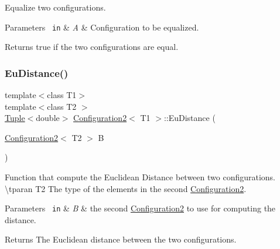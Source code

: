 Equalize two configurations. 


\begin{DoxyParams}[1]{Parameters}
\mbox{\texttt{ in}}  & {\em A} & Configuration to be equalized. \\
\hline
\end{DoxyParams}
\begin{DoxyReturn}{Returns}
true if the two configurations are equal. 
\end{DoxyReturn}
\mbox{\label{class_configuration2_aae3e1b7e718b227b6fa65db67ab2b8eb}} 
\subsubsection{\texorpdfstring{EuDistance()}{EuDistance()}}
{\footnotesize\ttfamily template$<$class T1$>$ \\
template$<$class T2 $>$ \\
\mbox{\hyperlink{class_tuple}{Tuple}}$<$double$>$ \mbox{\hyperlink{class_configuration2}{Configuration2}}$<$ T1 $>$\+::Eu\+Distance (\begin{DoxyParamCaption}\item[{\mbox{\hyperlink{class_configuration2}{Configuration2}}$<$ T2 $>$}]{B }\end{DoxyParamCaption})\hspace{0.3cm}{\ttfamily [inline]}}



Function that compute the Euclidean Distance between two configurations. \textbackslash{}tparan T2 The type of the elements in the second {\ttfamily \mbox{\hyperlink{class_configuration2}{Configuration2}}}. 


\begin{DoxyParams}[1]{Parameters}
\mbox{\texttt{ in}}  & {\em B} & the second {\ttfamily \mbox{\hyperlink{class_configuration2}{Configuration2}}} to use for computing the distance. \\
\hline
\end{DoxyParams}
\begin{DoxyReturn}{Returns}
The Euclidean distance between the two configurations. 
\end{DoxyReturn}
\mbox{\label{class_configuration2_afb287896fc721e64bc50425795a84a77}} 
